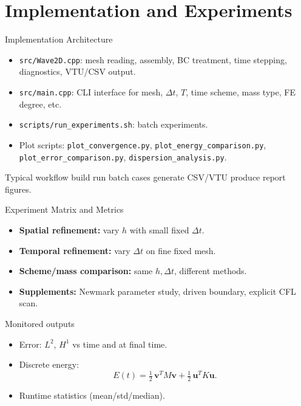 \documentclass{beamer}
\begin{document}
\section{Implementation and Experiments}

\begin{frame}{Implementation Architecture}
  \begin{itemize}
    \item \texttt{src/Wave2D.cpp}: mesh reading, assembly, BC treatment,
          time stepping, diagnostics, VTU/CSV output.
    \item \texttt{src/main.cpp}: CLI interface for
          mesh, $\Delta t$, $T$, time scheme, mass type, FE degree, etc.
    \item \texttt{scripts/run\_experiments.sh}: batch experiments.
    \item Plot scripts:
      \texttt{plot\_convergence.py},
      \texttt{plot\_energy\_comparison.py},
      \texttt{plot\_error\_comparison.py},
      \texttt{dispersion\_analysis.py}.
  \end{itemize}

  \begin{block}{Typical workflow}
    build \textrightarrow{} run batch cases \textrightarrow{}
    generate CSV/VTU \textrightarrow{} produce report figures.
  \end{block}
\end{frame}

\begin{frame}{Experiment Matrix and Metrics}
  \begin{itemize}
    \item \textbf{Spatial refinement:} vary $h$ with small fixed $\Delta t$.
    \item \textbf{Temporal refinement:} vary $\Delta t$ on fine fixed mesh.
    \item \textbf{Scheme/mass comparison:} same $h,\Delta t$, different methods.
    \item \textbf{Supplements:}
      Newmark parameter study, driven boundary, explicit CFL scan.
  \end{itemize}

  \begin{block}{Monitored outputs}
    \begin{itemize}
      \item Error: $L^2$, $H^1$ vs time and at final time.
      \item Discrete energy:
        \[
          E(t)=\tfrac12\,\mathbf v^T M\mathbf v
          +\tfrac12\,\mathbf u^T K\mathbf u.
        \]
      \item Runtime statistics (mean/std/median).
    \end{itemize}
  \end{block}
\end{frame}
\end{document}
